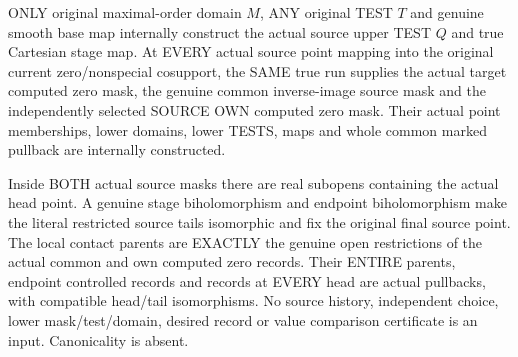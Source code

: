 \begin{theorem}
\label{hir:original-smooth-actual-computed-zero-mask-choice-histories}
\leanok
ONLY original maximal-order domain $M$, ANY original TEST $T$ and genuine
smooth base map internally construct the actual source upper TEST $Q$ and
true Cartesian stage map. At EVERY actual source point mapping into the
original current zero/nonspecial cosupport, the SAME true run supplies the
actual target computed zero mask, the genuine common inverse-image source
mask and the independently selected SOURCE OWN computed zero mask. Their
actual point memberships, lower domains, lower TESTS, maps and whole common
marked pullback are internally constructed.

Inside BOTH actual source masks there are real subopens containing the
actual head point. A genuine stage biholomorphism and endpoint
biholomorphism make the literal restricted source tails isomorphic and fix
the original final source point. The local contact parents are EXACTLY
the genuine open restrictions of the actual common and own computed zero
records. Their ENTIRE parents, endpoint controlled records and records at
EVERY head are actual pullbacks, with compatible head/tail isomorphisms.
No source history, independent choice, lower mask/test/domain, desired
record or value comparison certificate is an input. Canonicality is absent.
\end{theorem}
